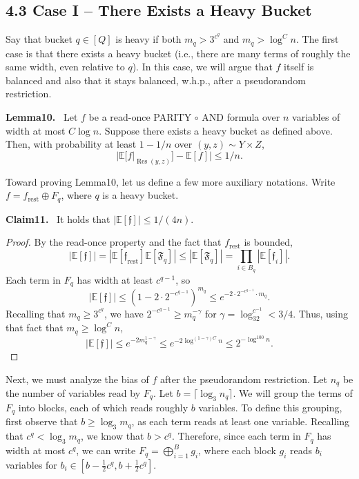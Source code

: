 \documentclass[10pt,a4paper]{article}
\newenvironment{authorclaim}[1]{\par\medskip\noindent\textbf{#1.}\ \ignorespaces}{\par\medskip}
\begin{document}
\subsection*{4.3 Case I -- There Exists a Heavy Bucket}
Say that bucket $q\in[Q]$ is heavy if both $m_q>3^{c^q}$ and $m_q>\log^C n$. The first case is that there exists a heavy bucket (i.e., there are many terms of roughly the same width, even relative to $q$). In this case, we will argue that $f$ itself is balanced and also that it stays balanced, w.h.p., after a pseudorandom restriction.
\begin{authorclaim}{Lemma10}
Let $f$ be a read-once PARITY $\circ$ AND formula over $n$ variables of width at most $C\log n$. Suppose there exists a heavy bucket as defined above. Then, with probability at least $1-1/n$ over $(y,z)\sim Y\times Z$,
\[
|\mathbb E[f|_{\operatorname{Res}(y,z)}]-\mathbb E[f]|\le1/n.
\]
\end{authorclaim}
Toward proving Lemma10, let us define a few more auxiliary notations. Write $f=f_{\mathrm{rest}}\oplus F_q$, where $q$ is a heavy bucket.
\begin{authorclaim}{Claim11}
It holds that $|\mathbb E[\mathfrak f]|\le1/(4n)$.
\end{authorclaim}
\begin{proof}
By the read-once property and the fact that $f_{\mathrm{rest}}$ is bounded,
\[
|\mathbb E[\mathfrak f]|=|\mathbb E[\mathfrak f_{\mathrm{rest}}]\mathbb E[\mathfrak F_q]|
\le|\mathbb E[\mathfrak F_q]|=\prod_{i\in B_q}|\mathbb E[\mathfrak f_i]|.
\]
Each term in $F_q$ has width at least $c^{q-1}$, so
\[
|\mathbb E[\mathfrak f]|\le(1-2\cdot2^{-c^{q-1}})^{m_q}\le e^{-2\cdot2^{-c^{q-1}}\cdot m_q}.
\]
Recalling that $m_q\ge3^{c^q}$, we have $2^{-c^{q-1}}\ge m_q^{-\gamma}$ for $\gamma=\log_32^{c^{-1}}<3/4$. Thus, using that fact that $m_q\ge\log^C n$,
\[
|\mathbb E[\mathfrak f]|\le e^{-2m_q^{1-\gamma}}\le e^{-2\log^{(1-\gamma)C}n}\le2^{-\log^{100}n}.
\]
\end{proof}
Next, we must analyze the bias of $f$ after the pseudorandom restriction. Let $n_q$ be the number of variables read by $F_q$. Let $b=\lceil\log_3n_q\rceil$. We will group the terms of $F_q$ into blocks, each of which reads roughly $b$ variables. To define this grouping, first observe that $b\ge\log_3m_q$, as each term reads at least one variable. Recalling that $c^q<\log_3m_q$, we know that $b>c^q$. Therefore, since each term in $F_q$ has width at most $c^q$, we can write $F_q=\bigoplus_{i=1}^Bg_i$, where each block $g_i$ reads $b_i$ variables for $b_i\in[b-\frac12c^q,b+\frac12c^q]$.
\end{document}
